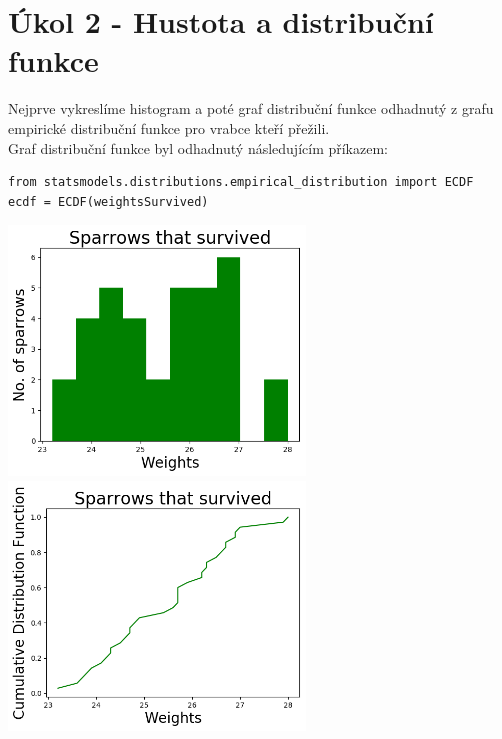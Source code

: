 \documentclass[12pt,a4paper]{article}
\begin{document}
\section{Úkol 2 - Hustota a distribuční funkce}
Nejprve vykreslíme histogram a poté graf distribuční funkce odhadnutý z grafu empirické distribuční funkce pro vrabce kteří přežili.\\
Graf distribuční funkce byl odhadnutý následujícím příkazem:\par \medskip
\begin{lstlisting}
from statsmodels.distributions.empirical_distribution import ECDF
ecdf = ECDF(weightsSurvived)
\end{lstlisting}
\smallskip
\noindent \includegraphics[width=3.1in]{survivedHist}
\includegraphics[width=3.1in]{survivedDist}
\pagebreak
\end{document}
